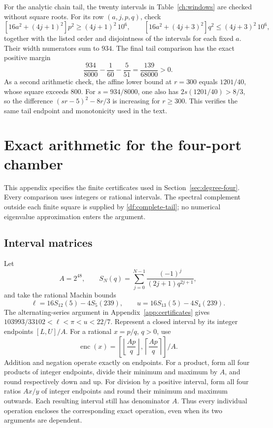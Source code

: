 \documentclass[11pt,reqno]{amsart}
\numberwithin{equation}{section}
\begin{document}
For the analytic chain tail, the twenty intervals in
Table~\ref{ch:windows} are checked without square roots. For its row
$(a,j,p,q)$, check
\[
 [16a^2+(4j+1)^2]p^2\ge(4j+1)^2\,10^6,
 \qquad
 [16a^2+(4j+3)^2]q^2\le(4j+3)^2\,10^6,
\]
together with the listed order and disjointness of the intervals for
each fixed $a$. Their width numerators sum to $934$. The final tail
comparison has the exact positive margin
\[
 \frac{934}{8000}-\frac1{60}-\frac5{51}
 =\frac{139}{68000}>0.
\]
As a second arithmetic check, the affine lower bound at $r=300$ equals
$1201/40$, whose square exceeds $800$. For
$s=934/8000$, one also has $2s(1201/40)>8/3$, so the difference
$(sr-5)^2-8r/3$ is increasing for $r\ge300$. This verifies the same
tail endpoint and monotonicity used in the text.

\section{Exact arithmetic for the four-port chamber}
\label{df:appendix}

This appendix specifies the finite certificates used in
Section~\ref{sec:degree-four}. Every comparison uses integers or
rational intervals. The spectral complement outside each finite
square is supplied by \eqref{df:complete-tail}; no numerical
eigenvalue approximation enters the argument.

\subsection{Interval matrices}

Let
\[
 A=2^{48},\qquad
 S_N(q)=\sum_{j=0}^{N-1}\frac{(-1)^j}{(2j+1)q^{2j+1}},
\]
and take the rational Machin bounds
\[
 \ell=16S_{12}(5)-4S_5(239),\qquad
 u=16S_{13}(5)-4S_4(239).
\]
The alternating-series argument in
Appendix~\ref{app:certificates} gives
$103993/33102<\ell<\pi<u<22/7$.
Represent a closed interval by its integer endpoints $[L,U]/A$.
For a rational $x=p/q$, $q>0$, use
\[
 \operatorname{enc}(x)=
 \left[\left\lfloor\frac{Ap}{q}\right\rfloor,
       \left\lceil\frac{Ap}{q}\right\rceil\right]/A.
\]
Addition and negation operate exactly on endpoints. For a product,
form all four products of integer endpoints, divide their minimum
and maximum by $A$, and round respectively down and up. For division
by a positive interval, form all four ratios $Ax/y$ of integer
endpoints and round their minimum and maximum outwards. Each
resulting interval still has denominator $A$. Thus every individual
operation encloses the corresponding exact operation, even when
its two arguments are dependent.
\end{document}
